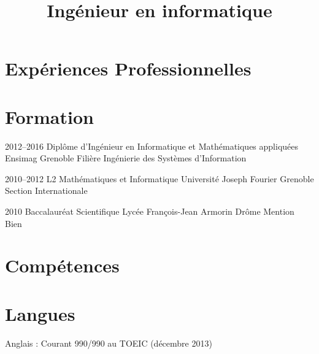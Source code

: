 \documentclass[11pt,a4paper,sans]{moderncv} %
\title{Ingénieur en informatique}
\title{}
\begin{document}
\makecvtitle %
\vspace*{-0.75cm}


\section{Expériences Professionnelles}







\section{Formation}
\cventry
    {2012--2016}
    {Diplôme d'Ingénieur en Informatique et Mathématiques appliquées}
    {}
    {Ensimag}
    {Grenoble}
    {Filière Ingénierie des Systèmes d'Information}
    
\cventry
    {2010--2012}
    {L2 Mathématiques et Informatique}
    {}
    {Université Joseph Fourier}
    {Grenoble}
    {Section Internationale}
    
\cventry
    {2010}
    {Baccalauréat Scientifique}
    {}
    {Lycée François-Jean Armorin}
    {Drôme}
    {Mention Bien}


\section{Compétences}




\section{Langues}

\cvitemwithcomment
    {}
    {Anglais : Courant}
    {990/990 au TOEIC (décembre 2013)}
\end{document}

